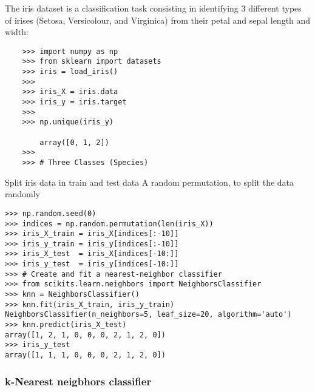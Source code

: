 \documentclass[SKL-MASTER.tex]{subfiles}
\begin{document}
The iris dataset is a classification task consisting in identifying 3 different types of irises (Setosa, Versicolour, and Virginica) from their petal and sepal length and width:

\begin{framed}
	\begin{verbatim}
	>>> import numpy as np
	>>> from sklearn import datasets
	>>> iris = load_iris()
	>>>
	>>> iris_X = iris.data
	>>> iris_y = iris.target
	>>>
	>>> np.unique(iris_y)
	
		array([0, 1, 2])
	>>>
	>>> # Three Classes (Species)
	\end{verbatim}
\end{framed}


Split iris data in train and test data
A random permutation, to split the data randomly
\begin{framed}
	\begin{verbatim}
>>> np.random.seed(0)
>>> indices = np.random.permutation(len(iris_X))
>>> iris_X_train = iris_X[indices[:-10]]
>>> iris_y_train = iris_y[indices[:-10]]
>>> iris_X_test  = iris_X[indices[-10:]]
>>> iris_y_test  = iris_y[indices[-10:]]
>>> # Create and fit a nearest-neighbor classifier
>>> from scikits.learn.neighbors import NeighborsClassifier
>>> knn = NeighborsClassifier()
>>> knn.fit(iris_X_train, iris_y_train)
NeighborsClassifier(n_neighbors=5, leaf_size=20, algorithm='auto')
>>> knn.predict(iris_X_test)
array([1, 2, 1, 0, 0, 0, 2, 1, 2, 0])
>>> iris_y_test
array([1, 1, 1, 0, 0, 0, 2, 1, 2, 0])

	\end{verbatim}
\end{framed}

\subsubsection{k-Nearest neigbhors classifier}
\end{document}
